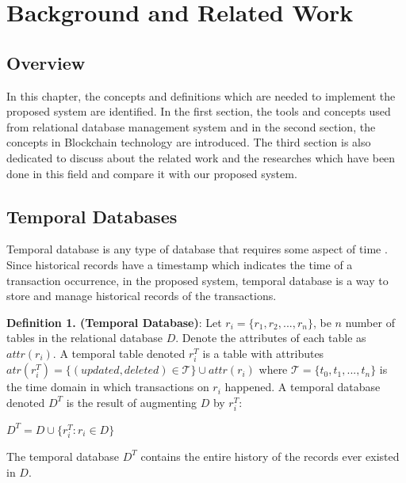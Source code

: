 \chapter{Background and Related Work}

\section{Overview}

In this chapter, the concepts and definitions which are needed to implement the proposed system are identified. In the first section, the tools and concepts used from relational database management system and in the second section, the concepts in Blockchain technology are introduced. The third section is also dedicated to discuss about the related work and the researches which have been done in this field and compare it with our proposed system.

\section{Temporal Databases}
Temporal database is any type of database that requires some aspect of time \cite {elmasri2010fundamentalsofdatabase}. Since historical records have a timestamp which indicates the time of a transaction occurrence, in the proposed system, temporal database is a way to store and manage historical records of the transactions.


\textbf {Definition 1. (Temporal Database)}:
Let $ r_i = \{r_1, r_2, ... , r_n \}$, be $n$ number of tables in the relational database $D$. Denote the attributes of each table as $attr(r_i)$. A temporal table denoted $r_i^T$ is a table with attributes $atr(r_i^T) = \{ (updated, deleted) \in \mathcal{T} \}\cup attr(r_i)$ where $\mathcal{T} = \{t_0,t_1,...,t_n\}$ is the time domain in which transactions on $r_i$ happened. A temporal database denoted $D^T$ is the result of augmenting $D$ by $r_i^T$:

\begin{center}
	{$D^T = D \cup \{{r_i^T}: r_i \in D \}$}
\end{center}

The temporal database $D^T$ contains the entire history of the records ever existed in $D$.

